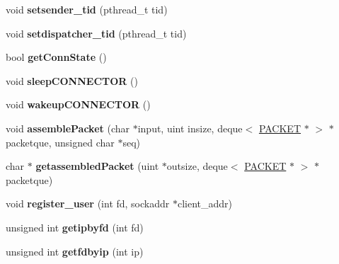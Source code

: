\begin{DoxyCompactItemize}
\item 
\hypertarget{classCONNECTION_ac059a7c53e9f22954b9b2060bb739d25}{}void {\bfseries setsender\+\_\+tid} (pthread\+\_\+t tid)\label{classCONNECTION_ac059a7c53e9f22954b9b2060bb739d25}

\item 
\hypertarget{classCONNECTION_a9310770dd036dfcaf531e49cad2a91f3}{}void {\bfseries setdispatcher\+\_\+tid} (pthread\+\_\+t tid)\label{classCONNECTION_a9310770dd036dfcaf531e49cad2a91f3}

\item 
\hypertarget{classCONNECTION_a5858f6269133a43b5dbe7221a78d3d22}{}bool {\bfseries get\+Conn\+State} ()\label{classCONNECTION_a5858f6269133a43b5dbe7221a78d3d22}

\item 
\hypertarget{classCONNECTION_a58b9e421d09110d58a8ee97a0d55378c}{}void {\bfseries sleep\+C\+O\+N\+N\+E\+C\+T\+O\+R} ()\label{classCONNECTION_a58b9e421d09110d58a8ee97a0d55378c}

\item 
\hypertarget{classCONNECTION_a42daf1a6d7e4ae33ed142c077eaf173b}{}void {\bfseries wakeup\+C\+O\+N\+N\+E\+C\+T\+O\+R} ()\label{classCONNECTION_a42daf1a6d7e4ae33ed142c077eaf173b}

\item 
\hypertarget{classCONNECTION_a5820c737079b8699ba43999f45e0f839}{}void {\bfseries assemble\+Packet} (char $\ast$input, uint insize, deque$<$ \hyperlink{classPACKET}{P\+A\+C\+K\+E\+T} $\ast$ $>$ $\ast$packetque, unsigned char $\ast$seq)\label{classCONNECTION_a5820c737079b8699ba43999f45e0f839}

\item 
\hypertarget{classCONNECTION_ad0ba06a5c12ec91ea98b36ad8e5f4979}{}char $\ast$ {\bfseries getassembled\+Packet} (uint $\ast$outsize, deque$<$ \hyperlink{classPACKET}{P\+A\+C\+K\+E\+T} $\ast$ $>$ $\ast$packetque)\label{classCONNECTION_ad0ba06a5c12ec91ea98b36ad8e5f4979}

\item 
\hypertarget{classCONNECTION_abdbd118327c75dca6de3f672671a5f52}{}void {\bfseries register\+\_\+user} (int fd, sockaddr $\ast$client\+\_\+addr)\label{classCONNECTION_abdbd118327c75dca6de3f672671a5f52}

\item 
\hypertarget{classCONNECTION_a4af528016616b4361943b3a086fdf62f}{}unsigned int {\bfseries getipbyfd} (int fd)\label{classCONNECTION_a4af528016616b4361943b3a086fdf62f}

\item 
\hypertarget{classCONNECTION_aa13a749c05b958d46273487de71f4c8e}{}unsigned int {\bfseries getfdbyip} (int ip)\label{classCONNECTION_aa13a749c05b958d46273487de71f4c8e}

\end{DoxyCompactItemize}
